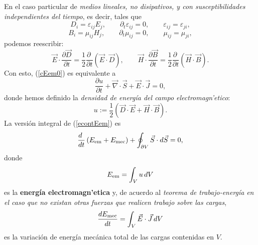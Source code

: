 En el caso particular de \textit{medios lineales, no disipativos, y con susceptibilidades
independientes del tiempo}, es decir, tales que
\begin{equation}
D_i=\varepsilon_{ij}E_j, \qquad \partial_t\varepsilon_{ij}=0, \qquad \varepsilon_{ij}=\varepsilon_{ji},
\end{equation}
\begin{equation}
B_i=\mu_{ij}H_j, \qquad \partial_t\mu_{ij}=0, \qquad \mu_{ij}=\mu_{ji},
\end{equation}
podemos reescribir:
\begin{equation}
 \vec{E}\cdot\frac{\partial \vec{D}}{\partial
t}=\frac{1}{2}\frac{\partial\ }{\partial t}\left(\vec{E}\cdot\vec{D}\right),
\qquad
 \vec{H}\cdot\frac{\partial \vec{B}}{\partial
t}=\frac{1}{2}\frac{\partial\ }{\partial t}\left(\vec{H}\cdot\vec{B}\right).
\end{equation}
Con esto, (\ref{cEem0}) es equivalente a
\begin{equation}
\boxed{\frac{\partial u}{\partial
t}+\vec\nabla\cdot\vec{S}+\vec{E}\cdot\vec{J}=0 ,} \label{econtEem}
\end{equation}
donde hemos definido la \textit{densidad de energía del campo
electromagn'etico}:
\begin{equation}\label{uDEHB}
\boxed{u:=\frac{1}{2}\left(\vec{D}\cdot\vec{E}+\vec{H}\cdot\vec{B}\right).}
\end{equation}
La versión integral de (\ref{econtEem}) es
\begin{equation}
\frac{d\ }{dt}\left(E_{\rm em}+E_{\rm mec}\right)+\oint_{\partial
V}\vec{S}\cdot d\vec{S}=0 ,
\end{equation}
donde
\begin{equation}
E_{\rm em}=\int_V u\,dV
\end{equation}
es la \textbf{energía electromagn'etica} y, de acuerdo al \textit{teorema de trabajo-energía} \textit{en el caso que no existan otras fuerzas que realicen trabajo sobre las cargas},
\begin{equation}
 \frac{dE_{\rm mec}}{dt}=\int_V\vec{E}\cdot\vec{J}\,dV
\end{equation}
es la variación de energía mecánica total de las cargas contenidas en $V$.

